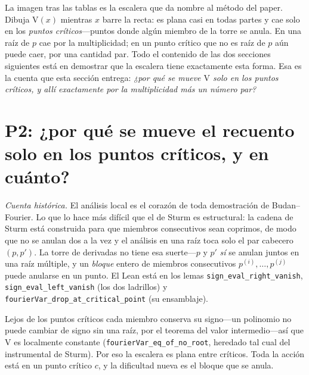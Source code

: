 \documentclass[11pt]{article}
\newcommand{\lean}[1]{\texttt{#1}}
\newcommand{\V}{\mathrm{V}}
\begin{document}
La imagen tras las tablas es la escalera que da nombre al m\'etodo del paper. Dibuja $\V(x)$ mientras
$x$ barre la recta: es plana casi en todas partes y cae solo en los \emph{puntos cr\'iticos}---puntos
donde alg\'un miembro de la torre se anula. En una ra\'iz de $p$ cae por la multiplicidad; en un punto
cr\'itico que no es ra\'iz de $p$ a\'un puede caer, por una cantidad par. Todo el contenido de las dos
secciones siguientes est\'a en demostrar que la escalera tiene exactamente esta forma. Esa es la
cuenta que esta secci\'on entrega: \emph{¿por qu\'e se mueve $\V$ solo en los puntos cr\'iticos, y
all\'i exactamente por la multiplicidad m\'as un n\'umero par?}

\section{P2: ¿por qu\'e se mueve el recuento solo en los puntos cr\'iticos, y en cu\'anto?}\label{sec:q2}

\emph{Cuenta hist\'orica.} El an\'alisis local es el coraz\'on de toda demostraci\'on de
Budan--Fourier. Lo que lo hace m\'as dif\'icil que el de Sturm es estructural: la cadena de Sturm est\'a
construida para que miembros consecutivos sean coprimos, de modo que no se anulan dos a la vez y el
an\'alisis en una ra\'iz toca solo el par cabecero $(p,p')$. La torre de derivadas no tiene esa
suerte---$p$ y $p'$ \emph{s\'i} se anulan juntos en una ra\'iz m\'ultiple, y un \emph{bloque} entero de
miembros consecutivos $p^{(i)},\dots,p^{(j)}$ puede anularse en un punto. El Lean est\'a en los lemas
\lean{sign\_eval\_right\_vanish}, \lean{sign\_eval\_left\_vanish} (los dos ladrillos) y
\lean{fourierVar\_drop\_at\_critical\_point} (su ensamblaje).

Lejos de los puntos cr\'iticos cada miembro conserva su signo---un polinomio no puede cambiar de signo
sin una ra\'iz, por el teorema del valor intermedio---as\'i que $\V$ es localmente constante
(\lean{fourierVar\_eq\_of\_no\_root}, heredado tal cual del instrumental de Sturm). Por eso la escalera
es plana entre cr\'iticos. Toda la acci\'on est\'a en un punto cr\'itico $c$, y la dificultad nueva es
el bloque que se anula.
\end{document}
